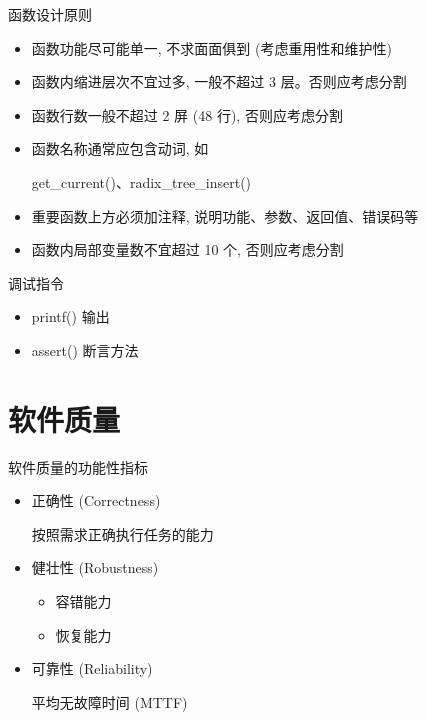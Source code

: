 \documentclass[10pt,t]{beamer}
\begin{document}
\begin{frame}{函数设计原则}
\begin{itemize}

    \item 函数功能尽可能单一, 不求面面俱到 (考虑重用性和维护性)
    \item 函数内缩进层次不宜过多, 一般不超过 3 层。否则应考虑分割
    \item 函数行数一般不超过 2 屏 (48 行), 否则应考虑分割
    \item 函数名称通常应包含动词, 如
        
        \alert{get\_current()}、\alert{radix\_tree\_insert()}

    \item 重要函数上方必须加注释, 说明功能、参数、返回值、错误码等

    \item 函数内局部变量数不宜超过 10 个, 否则应考虑分割
\end{itemize}
\end{frame}

\begin{frame}{调试指令}
\begin{itemize}
    \item printf() 输出
    \item assert() 断言方法
\end{itemize}

\end{frame}


\section{软件质量}
\begin{frame}{软件质量的功能性指标}
\begin{itemize}
    \item 正确性 (Correctness)

        按照需求正确执行任务的能力
    \item 健壮性 (Robustness)
    \begin{itemize}
        \item 容错能力
        \item 恢复能力
    \end{itemize}
    \item 可靠性 (Reliability)

        平均无故障时间 (MTTF)
\end{itemize}
\end{frame}
\end{document}
